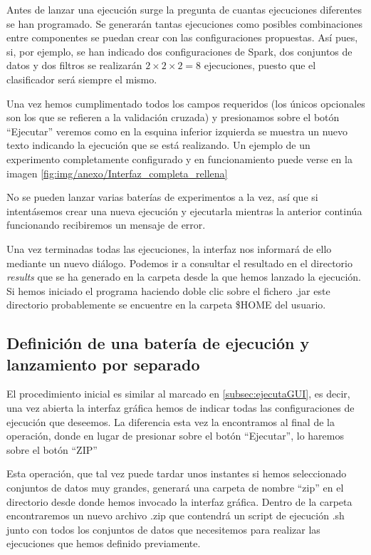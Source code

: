 Antes de lanzar una ejecución surge la pregunta de cuantas ejecuciones diferentes se han programado. Se generarán tantas ejecuciones como posibles combinaciones entre componentes se puedan crear con las configuraciones propuestas. Así pues, si, por ejemplo, se han indicado dos configuraciones de Spark, dos conjuntos de datos y dos filtros se realizarán $2 \times 2 \times 2 = 8$ ejecuciones, puesto que el clasificador será siempre el mismo.
	
Una vez hemos cumplimentado todos los campos requeridos (los únicos opcionales son los que se refieren a la validación cruzada) y presionamos sobre el botón ``Ejecutar'' veremos como en la esquina inferior izquierda se muestra un nuevo texto indicando la ejecución que se está realizando. Un ejemplo de un experimento completamente configurado y en funcionamiento puede verse en la imagen \ref{fig:img/anexo/Interfaz_completa_rellena}


No se pueden lanzar varias baterías de experimentos a la vez, así que si intentásemos crear una nueva ejecución y ejecutarla mientras la anterior continúa funcionando recibiremos un mensaje de error.

Una vez terminadas todas las ejecuciones, la interfaz nos informará de ello mediante un nuevo diálogo. Podemos ir a consultar el resultado en el directorio \textit{results} que se ha generado en la carpeta desde la que hemos lanzado la ejecución. Si hemos iniciado el programa haciendo doble clic sobre el fichero .jar este directorio probablemente se encuentre en la carpeta \$HOME del usuario.

\subsection{Definición de una batería de ejecución y lanzamiento por separado}\label{subsec:createZip}

El procedimiento inicial es similar al marcado en \ref{subsec:ejecutaGUI}, es decir, una vez abierta la interfaz gráfica hemos de indicar todas las configuraciones de ejecución que deseemos. La diferencia esta vez la encontramos al final de la operación, donde en lugar de presionar sobre el botón ``Ejecutar'', lo haremos sobre el botón ``ZIP''

Esta operación, que tal vez puede tardar unos instantes si hemos seleccionado conjuntos de datos muy grandes, generará una carpeta de nombre ``zip'' en el directorio desde donde hemos invocado la interfaz gráfica. Dentro de la carpeta encontraremos un nuevo archivo .zip que contendrá un script de ejecución .sh junto con todos los conjuntos de datos que necesitemos para realizar las ejecuciones que hemos definido previamente.

